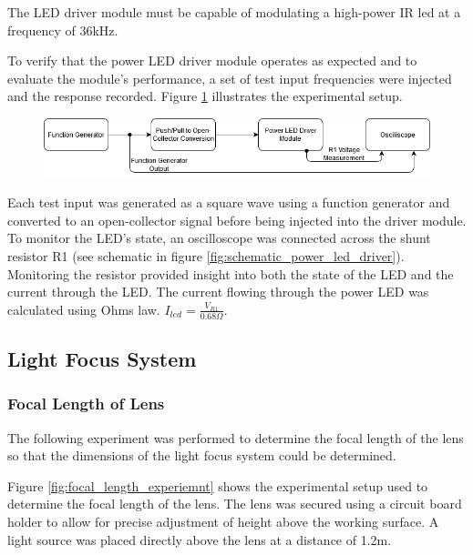 The LED driver module must be capable of modulating a high-power IR led at a frequency of 36kHz.

To verify that the power LED driver module operates as expected and to evaluate the module's performance, a set of test input frequencies were injected and the response recorded. Figure \ref{fig:power_led_driver_experiemnet_setup} illustrates the experimental setup.

\begin{figure}[H]
	\centering
	\includegraphics[width=.9\linewidth]{figures/experimentation/power_led_driver_experimental_setup.png}
	\label{fig:power_led_driver_experiemnet_setup}
\end{figure}

Each test input was generated as a square wave using a function generator and converted to an open-collector signal before being injected into the driver module. To monitor the LED's state, an oscilloscope was connected across the shunt resistor R1 (see schematic in figure \ref{fig:schematic_power_led_driver}). Monitoring the resistor provided insight into both the state of the LED and the current through the LED. The current flowing through the power LED was calculated using Ohms law. \(I_{led} = \frac{V_{R1}}{0.68\Omega}\).






\subsection{Light Focus System}
\subsubsection{Focal Length of Lens}
\label{exp:focal_length}

The following experiment was performed to determine the focal length of the lens so that the dimensions of the light focus system could be determined.

Figure \ref{fig:focal_length_experiemnt} shows the experimental setup used to determine the focal length of the lens. The lens was secured using a circuit board holder to allow for precise adjustment of height above the working surface. A light source was placed directly above the lens at a distance of 1.2m.

